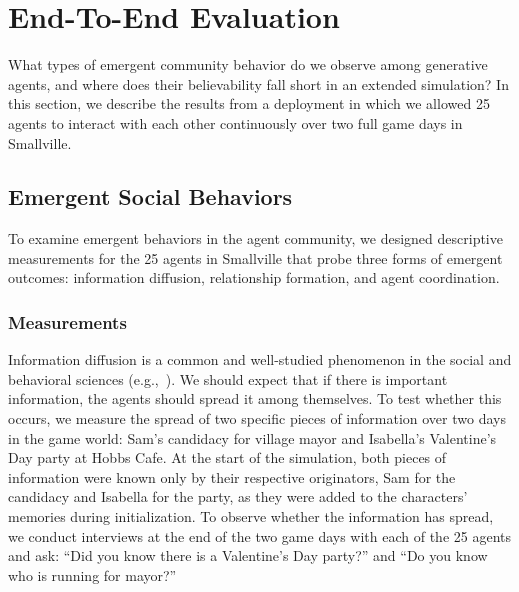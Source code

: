 \section{End-To-End Evaluation} What types of emergent community behavior do we observe among generative agents, and where does their believability fall short in an extended simulation? In this section, we describe the results from a deployment in which we allowed 25 agents to interact with each other continuously over two full game days in Smallville.

\subsection{Emergent Social Behaviors} To examine emergent behaviors in the agent community, we designed descriptive measurements for the 25 agents in Smallville that probe three forms of emergent outcomes: information diffusion, relationship formation, and agent coordination.

\subsubsection{Measurements} 
Information diffusion is a common and well-studied phenomenon in the social and behavioral sciences (e.g.,~\cite{easley2010networks}). We should expect that if there is important information, the agents should spread it among themselves. To test whether this occurs, we measure the spread of two specific pieces of information over two days in the game world: Sam's candidacy for village mayor and Isabella's Valentine's Day party at Hobbs Cafe. At the start of the simulation, both pieces of information were known only by their respective originators, Sam for the candidacy and Isabella for the party, as they were added to the characters' memories during initialization. To observe whether the information has spread, we conduct interviews at the end of the two game days with each of the 25 agents and ask: ``Did you know there is a Valentine's Day party?'' and ``Do you know who is running for mayor?''


